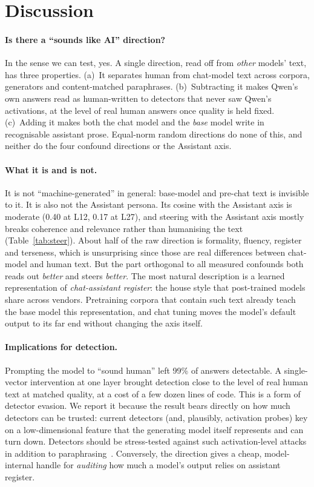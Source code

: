 \section{Discussion}
\label{sec:discussion}

\paragraph{Is there a ``sounds like AI'' direction?} In the sense we can test, yes. A single direction, read off from \emph{other} models' text, has three properties. (a)~It separates human from chat-model text across corpora, generators and content-matched paraphrases. (b)~Subtracting it makes Qwen's own answers read as human-written to detectors that never saw Qwen's activations, at the level of real human answers once quality is held fixed. (c)~Adding it makes both the chat model and the \emph{base} model write in recognisable assistant prose. Equal-norm random directions do none of this, and neither do the four confound directions or the Assistant axis.

\paragraph{What it is and is not.} It is not ``machine-generated'' in general: base-model and pre-chat text is invisible to it. It is also not the Assistant persona. Its cosine with the Assistant axis is moderate (0.40 at L12, 0.17 at L27), and steering with the Assistant axis mostly breaks coherence and relevance rather than humanising the text (Table~\ref{tab:steer}). About half of the raw direction is formality, fluency, register and terseness, which is unsurprising since those are real differences between chat-model and human text. But the part orthogonal to all measured confounds both reads out \emph{better} and steers \emph{better}. The most natural description is a learned representation of \emph{chat-assistant register}: the house style that post-trained models share across vendors. Pretraining corpora that contain such text already teach the base model this representation, and chat tuning moves the model's default output to its far end without changing the axis itself.

\paragraph{Implications for detection.} Prompting the model to ``sound human'' left 99\% of answers detectable. A single-vector intervention at one layer brought detection close to the level of real human text at matched quality, at a cost of a few dozen lines of code. This is a form of detector evasion. We report it because the result bears directly on how much detectors can be trusted: current detectors (and, plausibly, activation probes) key on a low-dimensional feature that the generating model itself represents and can turn down. Detectors should be stress-tested against such activation-level attacks in addition to paraphrasing~\citep{krishna2023paraphrasing,sadasivan2023can}. Conversely, the direction gives a cheap, model-internal handle for \emph{auditing} how much a model's output relies on assistant register.

